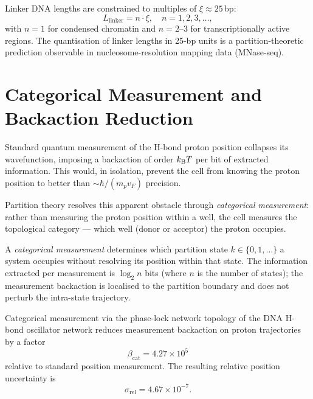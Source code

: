 \begin{corollary}
\label{cor:linker_prediction}
Linker DNA lengths are constrained to multiples of $\xi \approx 25$\,bp:
\begin{equation}
  L_{\mathrm{linker}} = n \cdot \xi, \quad n = 1, 2, 3, \ldots,
  \label{eq:linker_quantisation}
\end{equation}
with $n = 1$ for condensed chromatin and $n = 2$--$3$ for transcriptionally
active regions. The quantisation of linker lengths in 25-bp units is a
partition-theoretic prediction observable in nucleosome-resolution mapping data
(MNase-seq).
\end{corollary}

\section{Categorical Measurement and Backaction Reduction}
\label{sec:categorical_measurement}

Standard quantum measurement of the H-bond proton position collapses its
wavefunction, imposing a backaction of order $k_{\mathrm{B}} T$ per bit of extracted
information. This would, in isolation, prevent the cell from knowing the
proton position to better than $\sim \hbar/(m_p v_F)$ precision.

Partition theory resolves this apparent obstacle through \emph{categorical
measurement}: rather than measuring the proton position within a well, the cell
measures the topological category --- which well (donor or acceptor) the proton
occupies.

\begin{definition}
\label{def:categorical_measurement}
A \emph{categorical measurement} determines which partition state $k \in \{0,1,\ldots\}$
a system occupies without resolving its position within that state.
The information extracted per measurement is $\log_2 n$ bits (where $n$ is
the number of states); the measurement backaction is localised to the partition
boundary and does not perturb the intra-state trajectory.
\end{definition}

\begin{theorem}
\label{thm:backaction_reduction}
Categorical measurement via the phase-lock network topology of the DNA
H-bond oscillator network reduces measurement backaction on proton trajectories
by a factor
\begin{equation}
  \beta_{\mathrm{cat}} = 4.27 \times 10^5
  \label{eq:backaction_reduction_factor}
\end{equation}
relative to standard position measurement. The resulting relative
position uncertainty is
\begin{equation}
  \sigma_{\mathrm{rel}} = 4.67 \times 10^{-7}.
  \label{eq:relative_precision}
\end{equation}
\end{theorem}

